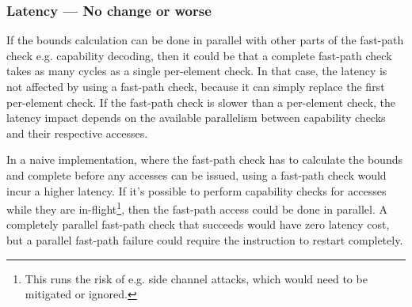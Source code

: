 \subsubsection*{Latency --- No change or worse}
If the bounds calculation can be done in parallel with other parts of the fast-path check e.g. capability decoding, then it could be that a complete fast-path check takes as many cycles as a single per-element check.
In that case, the latency is not affected by using a fast-path check, because it can simply replace the first per-element check.
If the fast-path check is slower than a per-element check, the latency impact depends on the available parallelism between capability checks and their respective accesses.

In a naive implementation, where the fast-path check has to calculate the bounds and complete before any accesses can be issued, using a fast-path check would incur a higher latency.
If it's possible to perform capability checks for accesses while they are in-flight\footnote{This runs the risk of e.g. side channel attacks, which would need to be mitigated or ignored.}, then the fast-path access could be done in parallel.
A completely parallel fast-path check that succeeds would have zero latency cost, but a parallel fast-path failure could require the instruction to restart completely.

